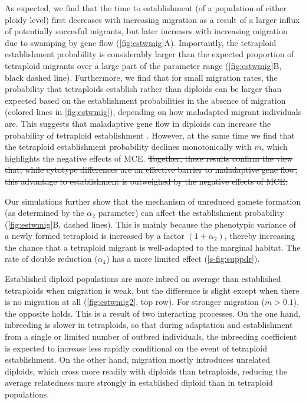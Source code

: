 \documentclass[12pt,a4paper]{article}
\providecommand{\DIFadd}[1]{{\protect\color{blue}\uwave{#1}}} %
\providecommand{\DIFdel}[1]{{\protect\color{red}\sout{#1}}}                      %
\providecommand{\DIFaddbegin}{} %
\providecommand{\DIFaddend}{} %
\providecommand{\DIFdelbegin}{} %
\providecommand{\DIFdelend}{} %
\begin{document}
As expected, we find that the time to establishment (of a population of either
ploidy level) first decreases with increasing migration as a result of a larger
influx of potentially succesful migrants, but later increases with increasing
migration due to swamping by gene flow (\cref{fig:estwmig}A).
Importantly, the tetraploid establishment probability is considerably larger
than the expected proportion of tetraploid migrants over a large part of the
parameter range (\cref{fig:estwmig}B, black dashed line).
Furthermore, we find that for small migration rates, the probability that
tetraploids establish rather than diploids can be larger than expected based on
the establishment probabilities in the absence of migration (colored lines in
\cref{fig:estwmig}), depending on how maladapted migrant individuals are.
This suggests that maladaptive gene flow in diploids can increase the
probability of tetraploid establishment \DIFaddbegin \DIFadd{in some cases}\DIFaddend .
However, at the same time we find that the tetraploid establishment probability
declines monotonically with $m$, which highlights the negative effects of MCE.
\DIFdelbegin \DIFdel{Together, these results confirm the view that, while cytotype differences are an
effective barrier to maladaptive gene flow, this advantage to establishment is
outweighed by the negative effects of MCE.
}\DIFdelend 

Our simulations further show that the mechanism of unreduced gamete formation
(as determined by the $\alpha_2$ parameter) can affect the establishment
probability (\cref{fig:estwmig}B, dashed lines).
This is mainly because the phenotypic variance of a newly formed tetraploid is
increased by a factor $(1+\alpha_2)$, thereby increasing the chance that a
tetraploid migrant is well-adapted to the marginal habitat.
The rate of double reduction ($\alpha_4$) has a more limited effect
(\cref{s-fig:suppdr}).

Established diploid populations are more inbred on average than established
tetraploids when migration is weak, but the difference is slight except when
there is no migration at all (\cref{fig:estwmig2}, top row).
For stronger migration ($m > 0.1$), the opposite holds.
This is a result of two interacting processes.
On the one hand, inbreeding is slower in tetraploids, so that during adaptation
and establishment from a single or limited number of outbred individuals, 
the inbreeding coefficient is expected to increase less rapidly conditional on
the event of tetraploid establishment.
On the other hand, migration mostly introduces unrelated diploids, which cross
more readily with diploids than tetraploids, reducing the average relatedness
more strongly in established diploid than in tetraploid populations.
\end{document}
